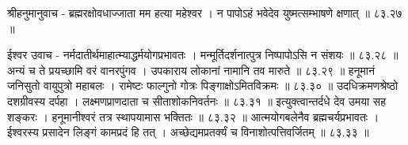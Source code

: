 श्रीहनुमानुवाच -
ब्रह्मरक्षोवधाज्जाता मम हत्या महेश्वर ।
न पापोऽहं भवेदेव युष्मत्सम्भाषणे क्षणात् ॥ ८३.२७ ॥

ईश्वर उवाच -
नर्मदातीर्थमाहात्म्याद्धर्मयोगप्रभावतः ।
मन्मूर्तिदर्शनात्पुत्र निष्पापोऽसि न संशयः ॥ ८३.२८ ॥
अन्यं च ते प्रयच्छामि वरं वानरपुंगव ।
उपकाराय लोकानां नामानि तव मारुते ॥ ८३.२९ ॥
हनूमानं जनिसुतो वायुपुत्रो महाबलः ।
रामेष्टः फाल्गुनो गोत्रः पिङ्गाक्षोऽमितविक्रमः ॥ ८३.३० ॥
उदधिक्रमणश्रेष्ठो दशग्रीवस्य दर्पहा ।
लक्ष्मणप्राणदाता च सीताशोकनिवर्तनः ॥ ८३.३१ ॥
इत्युक्त्वान्तर्दधे देव उमया सह शङ्करः ।
हनूमानीश्वरं तत्र स्थापयामास भक्तितः ॥ ८३.३२ ॥
आत्मयोगबलेनैव ब्रह्मचर्यप्रभावतः ।
ईश्वरस्य प्रसादेन लिङ्गं कामप्रदं हि तत् ।
अच्छेद्यमप्रतर्क्यं च विनाशोत्पत्तिवर्जितम् ॥ ८३.३३ ॥






